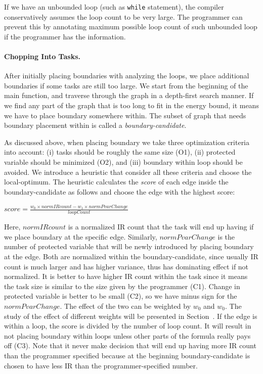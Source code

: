 If we have an unbounded loop (such as {\tt while} statement), the compiler conservatively assumes the loop count to be very large.
The programmer can prevent this by annotating maximum possible loop count of such unbounded loop if the programmer has the information.

\paragraph{Chopping Into Tasks.} 

After initially placing boundaries with analyzing the loops, we place additional boundaries if some tasks are still too large.
We start from the beginning of the main function, and traverse through the graph in a depth-first search manner. If we find
any part of the graph that is too long to fit in the energy bound, it means we have to place boundary somewhere within. The subset of graph
that needs boundary placement within is called a {\em boundary-candidate}.

As discussed above, when placing boundary we take three optimization criteria into account: (i) tasks should be roughly the same size (O1),
(ii) protected variable should be minimized (O2), and (iii) boundary within loop should be avoided. We introduce a heuristic that
consider all these criteria and choose the local-optimum. The heuristic calculates the {\em score} of each edge inside the boundary-candidate
as follows and choose the edge with the highest score:

\begin{center}
$score = \frac{w_{0}\times normIRcount - w_{1}\times normPvarChange}{loopCount}$
\end{center}

Here, $normIRcount$ is a normalized IR count that the task will end up having if we place boundary at the specific edge. Similarly, $normPvarChange$ is
the number of protected variable that will be newly introduced by placing boundary at the edge. Both are normalized within the boundary-candidate, since
usually IR count is much larger and has higher variance, thus has dominating effect if not normalized. It is better to have higher IR count within the task
since it means the task size is similar to the size given by the programmer (C1). Change in protected variable is better to be small (C2), so we have minus sign
for the $normPvarChange$. The effect of the two can be weighted by $w_{0}$ and $w_{0}$. The study of the effect of different weights will be presented in Section~{}.
If the edge is within a loop, the score is divided by the number of loop count. It will result in not placing boundary within loops 
unless other parts of the formula really pays off (C3). Note that it never make decision that will end up having more IR count than the programmer specified
because at the beginning boundary-candidate is chosen to have less IR than the programmer-specified number.

